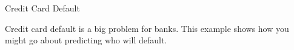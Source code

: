 \documentclass[11pt]{beamer}
\begin{document}
\begin{frame}{
	\begin{minipage}[t]{0.55\textwidth}
		Credit Card Default
	\end{minipage}
	\hfill
	\begin{minipage}[t]{0.35\textwidth}
		\flushright
	\end{minipage}
}{}
Credit card default is a big problem for banks. This example shows how you might go about
predicting who will default.
\begin{center}
\end{center}
\end{frame}
\end{document}
